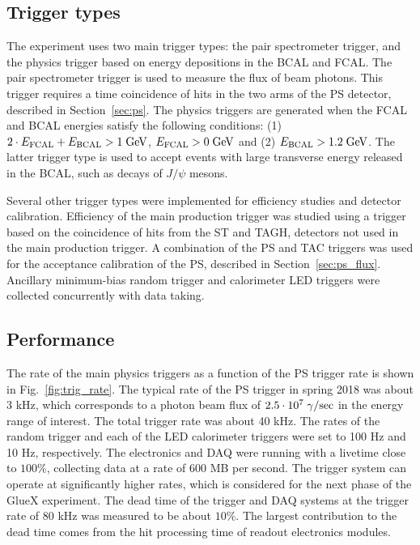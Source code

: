 \subsection{Trigger types \label{sec:triggers}}

The \gx{} experiment uses two main trigger types: the pair spectrometer trigger, and the physics trigger based on energy depositions in the BCAL and FCAL. The 
pair spectrometer trigger is used to measure the flux of beam photons. This trigger requires a time coincidence of hits in the 
two arms of the PS detector, described in Section~\ref{sec:ps}. The physics triggers are generated when the FCAL and BCAL energies  satisfy the following conditions: (1) $2\cdot E_{\rm FCAL} + E_{\rm BCAL} > 1\;{\rm GeV}$,  $E_{\rm FCAL} > 0\; {\rm GeV}$ and (2) $E_{\rm BCAL} > 1.2\;{\rm GeV}$. The latter trigger type is used to accept events with large transverse energy released in the BCAL, such as decays of $J/\psi$ mesons. 

Several other trigger types were implemented for efficiency studies and detector calibration. 
Efficiency of the main production trigger was studied using a trigger based on the coincidence of hits from the ST and TAGH, detectors not used in the main production trigger. A combination of the PS and TAC triggers was used for the acceptance calibration of the PS, described in Section~\ref{sec:ps_flux}. Ancillary minimum-bias random trigger and calorimeter LED triggers were collected concurrently with data taking.

\subsection{Performance \label{sec:trigperformance}}
The rate of the main physics triggers as a function of the PS trigger rate is shown in Fig.~\ref{fig:trig_rate}.
The typical rate of the PS trigger in spring 2018 was about 3 kHz, which corresponds to a photon beam flux of $2.5\cdot 10^7\; \gamma/{\rm sec}$ in the \gx{} energy range of interest. The total trigger rate was about 40 kHz. The rates of the random trigger and each of the LED calorimeter triggers were set to 100 Hz and 10 Hz, respectively. The electronics and DAQ were running with a livetime close to 
$100 \%$, collecting data at a rate of 600 MB per second.
The trigger system can operate at significantly higher rates, which is considered for the next phase
of the GlueX experiment. The dead time of the trigger and DAQ systems at the trigger rate of 80 kHz
was measured to be about $10 \%$. The largest contribution to the dead time comes from the hit processing
time of readout electronics modules. 

